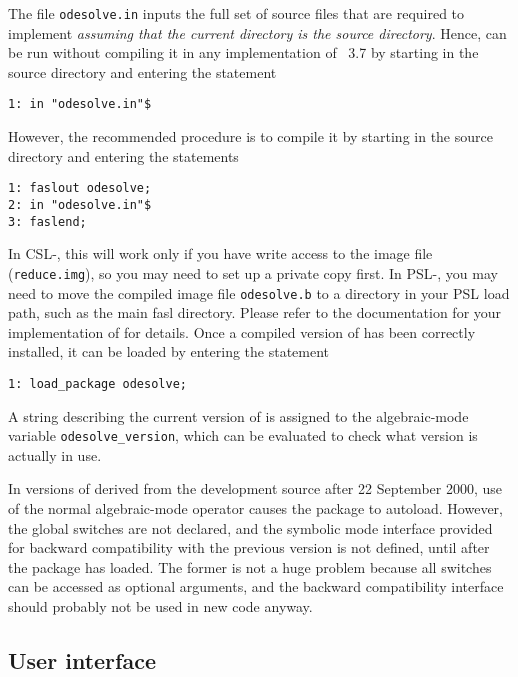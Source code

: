The file \texttt{odesolve.in} inputs the full set of source files that
are required to implement  \emph{assuming that the
current directory is the  source directory}.  Hence,
 can be run without compiling it in any implementation of
\REDUCE~3.7 by starting \REDUCE{} in the  source
directory and entering the statement
\begin{verbatim}
1: in "odesolve.in"$
\end{verbatim}

However, the recommended procedure is to compile it by starting
\REDUCE{} in the  source directory and entering the
statements
\begin{verbatim}
1: faslout odesolve;
2: in "odesolve.in"$
3: faslend;
\end{verbatim}
In CSL-\REDUCE{}, this will work only if you have write access to the
\REDUCE{} image file (\texttt{reduce.img}), so you may need to set up
a private copy first.  In PSL-\REDUCE{}, you may need to move the
compiled image file \texttt{odesolve.b} to a directory in your PSL
load path, such as the main fasl directory.  Please refer to the
documentation for your implementation of \REDUCE{} for details.  Once
a compiled version of  has been correctly installed, it
can be loaded by entering the \REDUCE{} statement
\begin{verbatim}
1: load_package odesolve;
\end{verbatim}

A string describing the current version of  is assigned
to the algebraic-mode variable \verb|odesolve_version|, which can be
evaluated to check what version is actually in use.

In versions of \REDUCE{} derived from the development source after 22
September 2000, use of the normal algebraic-mode \odesolve{} operator
causes the package to autoload.  However, the  global
switches are not declared, and the symbolic mode interface provided
for backward compatibility with the previous version is not defined,
until after the package has loaded.  The former is not a huge problem
because all \ODESolve{} switches can be accessed as optional
arguments, and the backward compatibility interface should probably
not be used in new code anyway.


\subsection{User interface}

